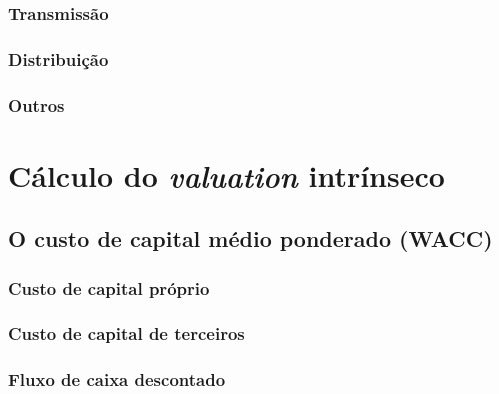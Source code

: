 \documentclass[grad,numbers]{coppe}
\begin{document}
  \hypertarget{transmissuxe3o}{%
  \subsubsection{Transmissão}\label{transmissuxe3o}}

  \hypertarget{distribuiuxe7uxe3o}{%
  \subsubsection{Distribuição}\label{distribuiuxe7uxe3o}}

  \hypertarget{outros}{%
  \subsubsection{Outros}\label{outros}}

  \hypertarget{cuxe1lculo-do-valuation-intruxednseco}{%
  \section{\texorpdfstring{Cálculo do \emph{valuation} intrínseco}{Cálculo do valuation intrínseco}}\label{cuxe1lculo-do-valuation-intruxednseco}}

  \hypertarget{o-custo-de-capital-muxe9dio-ponderado-wacc}{%
  \subsection{O custo de capital médio ponderado (WACC)}\label{o-custo-de-capital-muxe9dio-ponderado-wacc}}

  \hypertarget{custo-de-capital-pruxf3prio}{%
  \subsubsection{Custo de capital próprio}\label{custo-de-capital-pruxf3prio}}

  \hypertarget{custo-de-capital-de-terceiros}{%
  \subsubsection{Custo de capital de terceiros}\label{custo-de-capital-de-terceiros}}

  \hypertarget{fluxo-de-caixa-descontado}{%
  \subsubsection{Fluxo de caixa descontado}\label{fluxo-de-caixa-descontado}}
\end{document}
